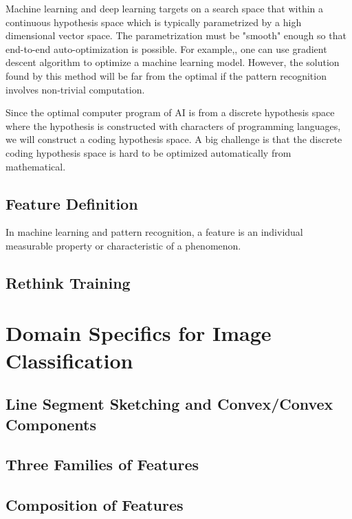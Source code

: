 \documentclass[11pt]{article} 	%
\theoremstyle{definition}
\begin{document}
Machine learning and deep learning targets on a search space that within a continuous hypothesis space which is typically parametrized by a high dimensional vector space.  The parametrization must be "smooth" enough so that end-to-end auto-optimization is possible.  For example,, one can use gradient descent algorithm to optimize a machine learning model. However, the solution found by this method will be far from the optimal if the pattern recognition involves non-trivial computation.  

Since the optimal computer program of AI is from a discrete hypothesis space where the hypothesis is constructed with characters of programming languages, we will construct a coding hypothesis space. A big challenge is that the  discrete coding hypothesis space is hard to be optimized automatically from mathematical. 
\subsection{Feature Definition}
In machine learning and pattern recognition, a feature is an individual measurable property or characteristic of a phenomenon\cite{bishop2006pattern}.

\subsection{Rethink Training}



\section{Domain Specifics for Image Classification}

\subsection{Line Segment Sketching and Convex/Convex Components}

\subsection{Three Families of Features}

\subsection{Composition of Features}
\end{document}
